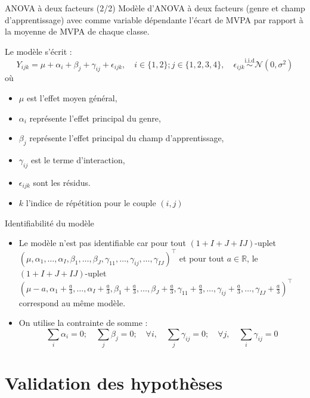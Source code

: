 \documentclass{beamer}
\begin{document}
	\begin{frame}{ANOVA à deux facteurs (2/2)}		
		Modèle d'ANOVA à deux facteurs (genre et champ d'apprentissage) avec comme variable dépendante l'écart de MVPA par rapport à la moyenne de MVPA de chaque classe.
		
		Le modèle s'écrit :
		\begin{equation}
			Y_{ijk} = \mu + \alpha_i + \beta_j + \gamma_{ij} + \epsilon_{ijk}, \quad i \in \{1,2\}; j\in \{1,2,3,4\},\quad \epsilon_{ijk} \overset{\text{i.i.d}}{\sim} \mathcal{N}(0, \sigma^2) 
		\end{equation}
		où
		\begin{itemize}
			\item $\mu$ est l'effet moyen général,
			\item $\alpha_i$ représente l'effet principal du genre,
			\item $\beta_j$ représente l'effet principal du champ d'apprentissage,
			\item $\gamma_{ij}$ est le terme d'interaction,
			\item $\epsilon_{ijk}$ sont les résidus.
			\item $k$ l'indice de répétition pour le couple $(i,j)$
		\end{itemize}
	\end{frame}
	
	\begin{frame}{Identifiabilité du modèle}
		\begin{itemize}
			\item Le modèle n'est pas identifiable car pour tout $(1+I+J+IJ)$-uplet $(\mu, \alpha_1, \ldots, \alpha_I, \beta_1, \ldots, \beta_J, \gamma_{11}, \ldots, \gamma_{ij}, \ldots, \gamma_{IJ})^\top$ et pour tout $a \in \mathbb{R}$, le $(1+I+J+IJ)$-uplet $(\mu-a, \alpha_1+\frac{a}{3}, \ldots, \alpha_I+\frac{a}{3}, \beta_1+\frac{a}{3}, \ldots, \beta_J+\frac{a}{3}, \gamma_{11}+\frac{a}{3}, \ldots, \gamma_{ij}+\frac{a}{3}, \ldots, \gamma_{IJ}+\frac{a}{3})^\top$ correspond au même modèle.
			\item On utilise la contrainte de somme :
			\begin{equation*}
				\sum_{i} \alpha_i = 0; \quad \sum_{j} \beta_j = 0; \quad \forall i, \quad \sum_{j} \gamma_{ij} = 0; \quad \forall j, \quad \sum_{i} \gamma_{ij} = 0
			\end{equation*}
		\end{itemize}
	\end{frame}
	
	\section{Validation des hypothèses}
	
\end{document}
